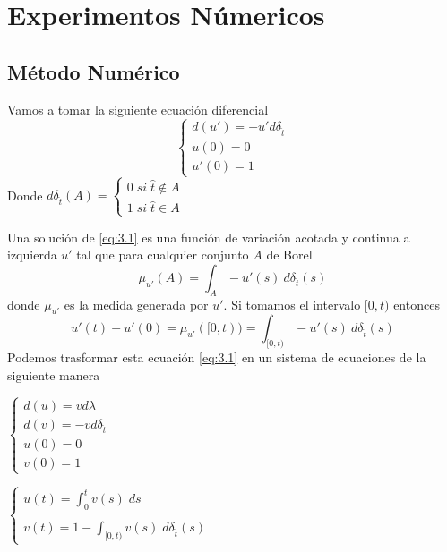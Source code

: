 \chapter{Experimentos Númericos}
\section{Método Numérico }
 
\begin{example}
Vamos a tomar la siguiente ecuación diferencial 
\begin{equation}
	\left\lbrace \begin{array}{l}
		d(u')=-u' d\delta_{\hat{t}}\\
		u(0)=0\\
		u'(0)=1
	\end{array}\right. \label{eq:3.1}
\end{equation} 
Donde $d\delta_{\hat{t}}(A)=\left\lbrace \begin{array}{l}
	0 \; si \; \hat{t}\notin A\\
	1 \; si \; \hat{t}\in A
\end{array}\right. $

Una solución de \ref{eq:3.1}   es una función de variación acotada y continua a izquierda $u'$ tal que  para cualquier conjunto $A$ de Borel
\begin{equation*}
	\mu_{u'}(A)=\int_A-u'(s)\: d\delta_{\hat{t}}(s)
\end{equation*}
donde $\mu_{u'}$ es la medida generada por $u'$. Si tomamos el intervalo $[0,t)$ entonces 
$$u'(t)-u'(0)=\mu_{u'}([0,t))=\int_{[0,t)}-u'(s)\: d\delta_{\hat{t}}(s)$$
 Podemos trasformar esta ecuación \ref{eq:3.1} en un sistema de ecuaciones de la siguiente manera
 \begin{multicols}{2}

 	$\left\lbrace \begin{array}{l}
 		d(u)=vd\lambda\\
 		d(v)=-v d\delta_{\hat{t}}\\
 		u(0)=0\\
 		v(0)=1
 	\end{array}\right. $
 
 	$\left\lbrace \begin{array}{l}
 		u(t)=\displaystyle\int_{0}^{t}v(s) \; ds\\
 		\\
 		v(t)=1-\displaystyle\int_{[0,t)}v(s) \; d\delta_{\hat{t}}(s)
 	\end{array}\right. $
 

\end{multicols}
\end{example}
